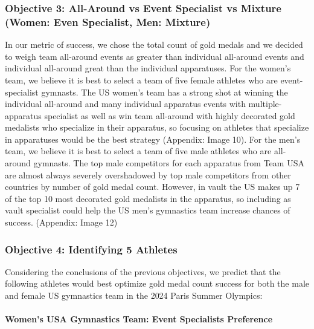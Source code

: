 \documentclass[
  10.5pt,
  letterpaper,
  DIV=11,
  numbers=noendperiod]{scrartcl}
\let\oldparagraph\paragraph
\renewcommand{\paragraph}[1]{\oldparagraph{#1}\mbox{}}
\begin{document}
\hypertarget{objective-3-all-around-vs-event-specialist-vs-mixture-women-even-specialist-men-mixture}{%
\subsubsection{Objective 3: All-Around vs Event Specialist vs Mixture
(Women: Even Specialist, Men:
Mixture)}\label{objective-3-all-around-vs-event-specialist-vs-mixture-women-even-specialist-men-mixture}}

In our metric of success, we chose the total count of gold medals and we
decided to weigh team all-around events as greater than individual
all-around events and individual all-around great than the individual
apparatuses. For the women's team, we believe it is best to select a
team of five female athletes who are event-specialist gymnasts. The US
women's team has a strong shot at winning the individual all-around and
many individual apparatus events with multiple-apparatus specialist as
well as win team all-around with highly decorated gold medalists who
specialize in their apparatus, so focusing on athletes that specialize
in apparatuses would be the best strategy (Appendix: Image 10). For the
men's team, we believe it is best to select a team of five male athletes
who are all-around gymnasts. The top male competitors for each apparatus
from Team USA are almost always severely overshadowed by top male
competitors from other countries by number of gold medal count. However,
in vault the US makes up 7 of the top 10 most decorated gold medalists
in the apparatus, so including as vault specialist could help the US
men's gymnastics team increase chances of success. (Appendix: Image 12)

\hypertarget{objective-4-identifying-5-athletes}{%
\subsubsection{Objective 4: Identifying 5
Athletes}\label{objective-4-identifying-5-athletes}}

Considering the conclusions of the previous objectives, we predict that
the following athletes would best optimize gold medal count success for
both the male and female US gymnastics team in the 2024 Paris Summer
Olympics:

\hypertarget{womens-usa-gymnastics-team-event-specialists-preference}{%
\paragraph{Women's USA Gymnastics Team: Event Specialists
Preference}\label{womens-usa-gymnastics-team-event-specialists-preference}}
\end{document}
